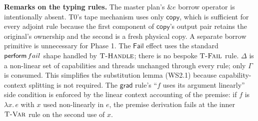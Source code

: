 \noindent\textbf{Remarks on the typing rules.}
The master plan's $\&e$ borrow operator is intentionally absent. T0's tape
mechanism uses only $\mathsf{copy}$, which is sufficient for every adjoint rule
because the first component of $\mathsf{copy}$'s output pair retains the
original's ownership and the second is a fresh physical copy. A separate borrow
primitive is unnecessary for Phase 1. The $\mathsf{Fail}$ effect uses the
standard $\mathsf{perform}\,fail$ shape handled by $\textsc{T-Handle}$; there is no
bespoke $\textsc{T-Fail}$ rule. $\Delta$ is a non-linear set of capabilities and
threads unchanged through every rule; only $\Gamma$ is consumed. This simplifies
the substitution lemma (WS2.1) because capability-context splitting is not
required. The $\mathsf{grad}$ rule's ``$f$ uses its argument linearly'' side
condition is enforced by the linear context accounting of the premise: if $f$
is $\lambda x.\, e$ with $x$ used non-linearly in $e$, the premise derivation
fails at the inner $\textsc{T-Var}$ rule on the second use of $x$.
